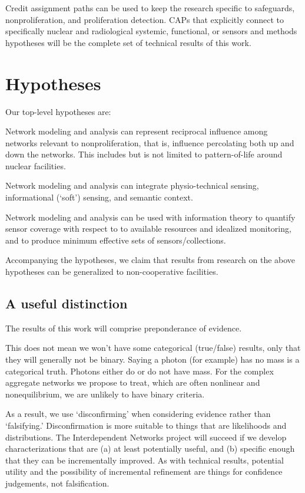 \documentclass{article} %
\begin{document}
Credit assignment paths can be used to keep the research specific to safeguards, nonproliferation, and proliferation detection. CAPs that explicitly connect to specifically nuclear and radiological systemic, functional, or sensors and methods hypotheses will be the complete set of technical results of this work.

\newpage
\section{Hypotheses}
\noindent Our top-level hypotheses are:
\renewcommand\labelitemi{\tiny$\bullet$}
\begin{enumerate*}
\item Network modeling and analysis can represent reciprocal influence among networks relevant to nonproliferation, that is, influence percolating both up and down the networks. This includes but is not limited to pattern-of-life around nuclear facilities.
\item Network modeling and analysis can integrate physio-technical sensing, informational (`soft') sensing, and semantic context.
\item Network modeling and analysis can be used with information theory to quantify sensor coverage with respect to to available resources and idealized monitoring, and to produce minimum effective sets of sensors/collections.
\end{enumerate*}

\noindent Accompanying the hypotheses, we claim that results from research on the above hypotheses can be generalized to non-cooperative facilities.

\subsection{A useful distinction}
The results of this work will comprise preponderance of evidence.

This does not mean we won't have some categorical (true/false) results, only that they will generally not be binary. Saying a photon (for example) has no mass is a  categorical truth. Photons either do or do not have mass. For the complex aggregate networks we propose to treat, which are often nonlinear and nonequilibrium, we are unlikely to have binary criteria.

As a result, we use `disconfirming' when considering evidence rather than `falsifying.' Disconfirmation is more suitable to things that are likelihoods and distributions. The Interdependent Networks project will succeed if we develop characterizations that are (a) at least potentially useful, and (b) specific enough that they can be incrementally improved. As with technical results, potential utility and the possibility of incremental refinement are things for confidence judgements, not falsification.
\end{document}
